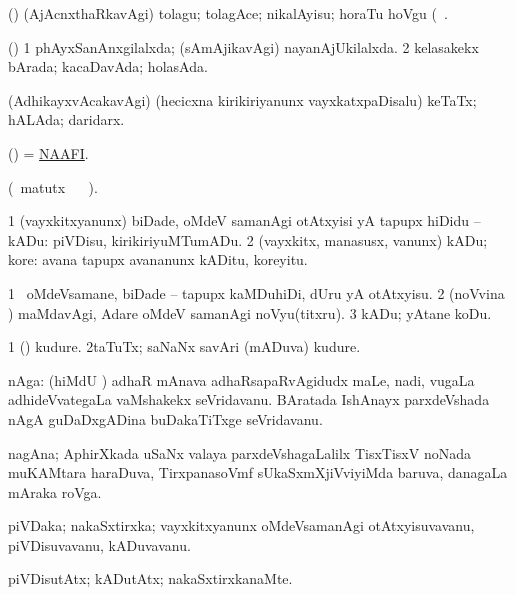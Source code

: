 \bentry
{}
\gl{\akirx}
\bmng
(\ashi) (AjAcnxthaRkavAgi) tolagu; tolagAce; nikalAyisu; horaTu hoVgu (\sA\ . 
\emng
\eentry

\bentry
{}
\gl{\gu}
\bmng
(\ashi) 
\bnum
\num{1} phAyxSanAnxgilalxda; (sAmAjikavAgi) nayanAjUkilalxda. 
\num{2} kelasakekx bArada; kacaDavAda; holasAda. 
\enum
\emng
\eentry

\bentry
{}
\gl{\gu}
\bmng
(AdhikayxvAcakavAgi) (hecicxna kirikiriyanunx vayxkatxpaDisalu) keTaTx; hALAda; daridarx. 
\emng
\eentry

\bentry
{}
\gl{\nA}
\bmng
(\ashi) = \hyperlink{NAAFI}{NAAFI}.
\emng
\eentry

\bentry
{}
\gl{\kirx}
\bmng
(\BU\ matutx \BUkaq\  \vakaq\ ). 
\emng

\noindent
\gl{\sakirx}
\bmng
\bnum
\num{1} (vayxkitxyanunx) biDade, oMdeV samanAgi otAtxyisi yA tapupx hiDidu -- kADu: piVDisu, kirikiriyuMTumADu. 
\num{2} (vayxkitx, manasusx, \mo vanunx) kADu; kore:  avana tapupx avananunx kADitu, koreyitu. 
\enum
\emng

\noindent
\gl{\akirx}
\bmng
\bnum
\num{1} \kanmu\ oMdeVsamane, biDade -- tapupx kaMDuhiDi, dUru yA otAtxyisu. 
\num{2} (noVvina \vi) maMdavAgi, Adare oMdeV samanAgi noVyu(titxru). 
\num{3} kADu; yAtane koDu. 
\enum
\emng
\eentry

\bentry
{}
\gl{\nA}
\bmng
\bnum
\num{1} (\AmA) kudure. 
\num{2}taTuTx; saNaNx savAri (mADuva) kudure. 
\enum
\emng
\eentry

\bentry
{}
\gl{\nA}
\bmng
nAga: 
\banum
{} (hiMdU \pu) adhaR mAnava adhaRsapaRvAgidudx maLe, nadi, \mo vugaLa adhideVvategaLa vaMshakekx seVridavanu. 
 BAratada IshAnayx parxdeVshada nAgA guDaDxgADina buDakaTiTxge seVridavanu. 
\eanum
\emng
\eentry

\bentry
{}
\gl{\nA}
\bmng
nagAna; AphirXkada uSaNx valaya parxdeVshagaLalilx TisxTisxV noNada muKAMtara haraDuva, TirxpanasoVmf sUkaSxmXjiVviyiMda baruva, danagaLa mAraka roVga. 
\emng
\eentry

\bentry
{}
\gl{\nA}
\bmng
piVDaka; nakaSxtirxka; vayxkitxyanunx oMdeVsamanAgi otAtxyisuvavanu, piVDisuvavanu, kADuvavanu. 
\emng
\eentry

\bentry
{}
\gl{\kirxvi}
\bmng
piVDisutAtx; kADutAtx; nakaSxtirxkanaMte. 
\emng
\eentry

